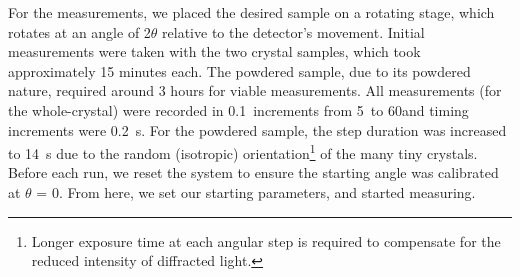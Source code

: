 \documentclass[a4paper,12pt,english]{all-in-one} %
\begin{document}
\begin{multicols}{2}
{For the measurements, we placed the desired sample on a rotating stage, which rotates at an angle of 2$\theta$ relative to the detector’s movement. Initial measurements were taken with the two crystal samples, which took approximately 15 minutes each. The powdered sample, due to its powdered nature, required around 3 hours for viable measurements. All measurements (for the whole-crystal) were recorded in 0.1\textdegree\ increments from 5\textdegree\ to 60\textdegree and timing increments were \SI{0.2}{\second}. For the powdered sample, the step duration was increased to \SI{14}{\second} due to the random (isotropic) orientation\footnote{Longer exposure time at each angular step is required to compensate for the reduced intensity of diffracted light.} of the many tiny crystals. Before each run, we reset the system to ensure the starting angle was calibrated at $\theta$ = 0. From here, we set our starting parameters, and started measuring. 
}




\end{multicols}
\end{document}
